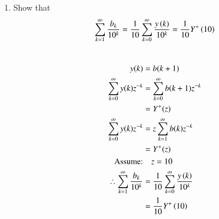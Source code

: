\documentclass[journal,12pt,twocolumn]{IEEEtran}
\renewcommand\thesection{\arabic{section}}
\begin{document}
\begin{enumerate}[label=\thesection.\arabic*,ref=\thesection.\theenumi]
		\item 
			Show that 
			\begin{align}
				\sum_{k=1}^{\infty}\frac{b_k}{10^k} =
				\frac{1}{10}\sum_{k=0}^{\infty}\frac{y\left(k\right)}{10^k} =\frac{1}{10}Y^{+}\left({10}\right)
			\end{align}
		\solution\\
			\begin{align}
				y(k)&=b(k+1)\\
				\sum_{k=0}^{\infty} y(k) z^{-k}&=\sum_{k=0}^{\infty} b(k+1) z^{-k}\\ & = Y^{+}(z)\\
				\sum_{k=0}^{\infty} y(k) z^{-k}&=z\sum_{k=1}^{\infty} b(k) z^{-k}\\ & = Y^{+}(z)\\
				\text{Assume:}& \quad z=10\\
				\therefore \sum_{k=1}^{\infty}\frac{b_k}{10^k} & =
				\frac{1}{10}\sum_{k=0}^{\infty}\frac{y\left(k\right)}{10^k}\\ & = \frac{1}{10}Y^{+}\left({10}\right)
			\end{align}
	

\end{enumerate}
\end{document}

